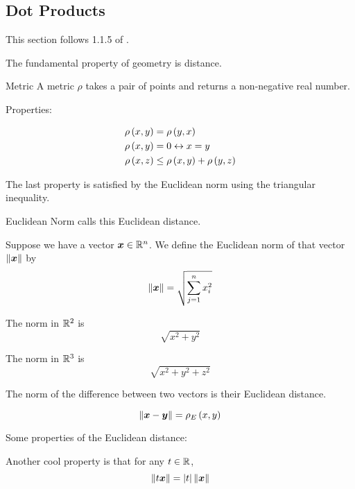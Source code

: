 \documentclass[11pt]{article}
\begin{document}

\subsection{Dot Products}
This section follows 1.1.5 of \cite{carlen}.

The fundamental property of geometry is distance.

\begin{definition}{Metric}
      A metric $\rho$ takes a pair of points and returns a non-negative real number.

      Properties:

      \begin{align*}
        \rho \left ( x, y \right) &= \rho \left ( y, x \right) \\
        \rho \left ( x, y \right) &= 0 \leftrightarrow x = y \\
        \rho \left ( x, z \right) & \leq \rho \left ( x, y \right) + \rho \left ( y, z \right) \\
      \end{align*}

      The last property is satisfied by the Euclidean norm using the triangular inequality.
\end{definition}

\begin{definition}{Euclidean Norm}
  \cite{carlen} calls this Euclidean distance.

  Suppose we have a vector $\bm{x} \in \mathbb R^n$.
  We define the Euclidean norm of that vector $\left\lVert\bm{x}\right\rVert$ by
  $$
  \left\lVert\bm{x}\right\rVert = \sqrt{\sum \limits_{j = 1}^n x_i^2}
  $$
\end{definition}

\begin{example}

  The norm in $\mathbb R^2$ is
  $$
  \sqrt{x^2 + y^2}
  $$
\end{example}

\begin{example}

  The norm in $\mathbb R^3$ is
  $$
  \sqrt{x^2 + y^2 + z^2}
  $$
\end{example}

The norm of the difference between two vectors is their Euclidean distance.

$$
\left\lVert\bm{x} - \bm{y}\right\rVert = \rho_E \left ( x, y \right)
$$

Some properties of the Euclidean distance:

Another cool property is that for any $t \in \mathbb R$,
$$\left\lVert t \bm{x}\right\rVert = \left\lvert t \right\rvert \left\lVert\bm{x}\right\rVert$$
\end{document}
